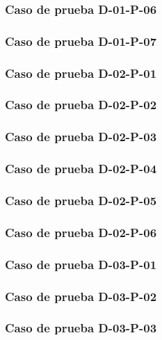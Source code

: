 \documentclass[10pt,a4paper]{article}
\begin{document}
			\subsubsection{Caso de prueba D-01-P-06}

			\subsubsection{Caso de prueba D-01-P-07}

			\subsubsection{Caso de prueba D-02-P-01}

			\subsubsection{Caso de prueba D-02-P-02}

			\subsubsection{Caso de prueba D-02-P-03}

			\subsubsection{Caso de prueba D-02-P-04}

			\subsubsection{Caso de prueba D-02-P-05}

			\subsubsection{Caso de prueba D-02-P-06}

			\subsubsection{Caso de prueba D-03-P-01}

			\subsubsection{Caso de prueba D-03-P-02}

			\subsubsection{Caso de prueba D-03-P-03}
\end{document}

